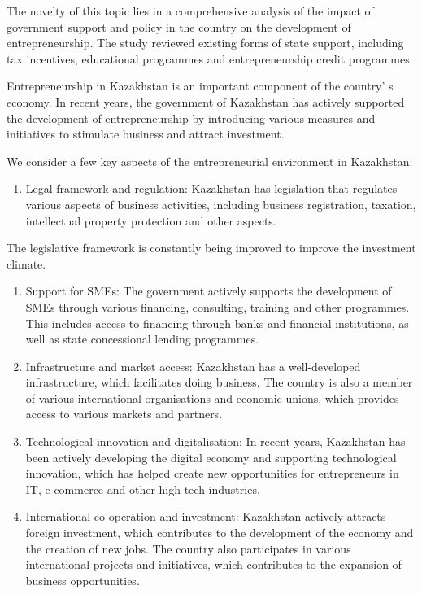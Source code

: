 The novelty of this topic lies in a comprehensive analysis of the impact
of government support and policy in the country on the development of
entrepreneurship. The study reviewed existing forms of state support,
including tax incentives, educational programmes and entrepreneurship
credit programmes.

Entrepreneurship in Kazakhstan is an important component of the
country' s economy. In recent years, the government of
Kazakhstan has actively supported the development of entrepreneurship by
introducing various measures and initiatives to stimulate business and
attract investment.

We consider a few key aspects of the entrepreneurial environment in
Kazakhstan:

\begin{enumerate}
\def\labelenumi{\arabic{enumi}.}
\item
  Legal framework and regulation: Kazakhstan has legislation that
  regulates various aspects of business activities, including business
  registration, taxation, intellectual property protection and other
  aspects.
\end{enumerate}

The legislative framework is constantly being improved to improve the
investment climate.

\begin{enumerate}
\def\labelenumi{\arabic{enumi}.}
\setcounter{enumi}{1}
\item
  Support for SMEs: The government actively supports the development of
  SMEs through various financing, consulting, training and other
  programmes. This includes access to financing through banks and
  financial institutions, as well as state concessional lending
  programmes.
\item
  Infrastructure and market access: Kazakhstan has a well-developed
  infrastructure, which facilitates doing business. The country is also
  a member of various international organisations and economic unions,
  which provides access to various markets and partners.
\item
  Technological innovation and digitalisation: In recent years,
  Kazakhstan has been actively developing the digital economy and
  supporting technological innovation, which has helped create new
  opportunities for entrepreneurs in IT, e-commerce and other high-tech
  industries.
\item
  International co-operation and investment: Kazakhstan actively
  attracts foreign investment, which contributes to the development of
  the economy and the creation of new jobs. The country also
  participates in various international projects and initiatives, which
  contributes to the expansion of business opportunities.
\end{enumerate}

